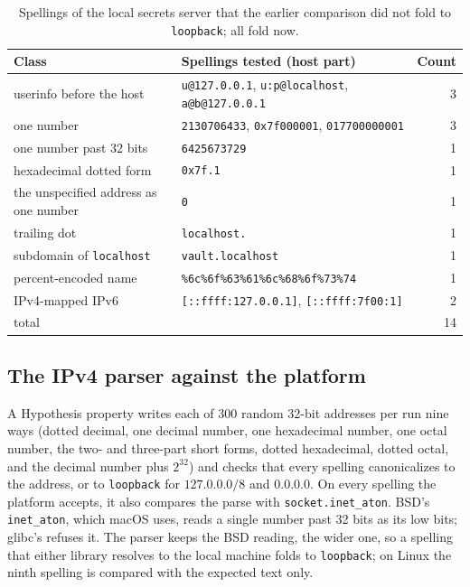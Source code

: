 \documentclass[11pt]{article}
\theoremstyle{plain}
\theoremstyle{definition}
\theoremstyle{remark}
\begin{document}
\begin{table}[ht]
\centering\small
\caption{Spellings of the local secrets server that the earlier comparison did not fold to
\texttt{loopback}; all fold now.}\label{tab:spellings}
\begin{tabular}{@{}llr@{}}
\toprule
Class & Spellings tested (host part) & Count \\
\midrule
userinfo before the host & \texttt{u@127.0.0.1}, \texttt{u:p@localhost}, \texttt{a@b@127.0.0.1} & 3 \\
one number & \texttt{2130706433}, \texttt{0x7f000001}, \texttt{017700000001} & 3 \\
one number past 32 bits & \texttt{6425673729} & 1 \\
hexadecimal dotted form & \texttt{0x7f.1} & 1 \\
the unspecified address as one number & \texttt{0} & 1 \\
trailing dot & \texttt{localhost.} & 1 \\
subdomain of \texttt{localhost} & \texttt{vault.localhost} & 1 \\
percent-encoded name & \texttt{\%6c\%6f\%63\%61\%6c\%68\%6f\%73\%74} & 1 \\
IPv4-mapped IPv6 & \texttt{[::ffff:127.0.0.1]}, \texttt{[::ffff:7f00:1]} & 2 \\
\midrule
total & & 14 \\
\bottomrule
\end{tabular}
\end{table}

\subsection{The IPv4 parser against the platform}\label{sec:aton}
A Hypothesis property writes each of 300 random 32-bit addresses per run nine ways (dotted decimal,
one decimal number, one hexadecimal number, one octal number, the two- and three-part short forms,
dotted hexadecimal, dotted octal, and the decimal number plus $2^{32}$) and checks that every
spelling canonicalizes to the address, or to \texttt{loopback} for $127.0.0.0/8$ and $0.0.0.0$. On
every spelling the platform accepts, it also compares the parse with \texttt{socket.inet\_aton}.
BSD's \texttt{inet\_aton}, which macOS uses, reads a single number past 32 bits as its low bits;
glibc's refuses it. The parser keeps the BSD reading, the wider one, so a spelling that either
library resolves to the local machine folds to \texttt{loopback}; on Linux the ninth spelling is
compared with the expected text only.
\end{document}
